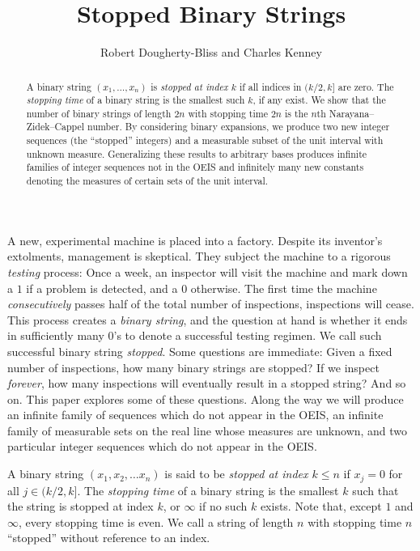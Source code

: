 \documentclass[12pt]{amsart}
\title{Stopped Binary Strings}
\author{Robert Dougherty-Bliss and Charles Kenney}
\theoremstyle{definition}
\begin{document}
\maketitle

\begin{abstract}
    A binary string $(x_1, \dots, x_n)$ is \emph{stopped at index $k$} if all
    indices in $(k / 2, k]$ are zero. The \emph{stopping time} of a binary
    string is the smallest such $k$, if any exist. We show that the number of
    binary strings of length $2n$ with stopping time $2n$ is the $n$th
    Narayana--Zidek--Cappel number. By considering binary expansions, we
    produce two new integer sequences (the ``stopped'' integers) and a
    measurable subset of the unit interval with unknown measure. Generalizing
    these results to arbitrary bases produces infinite families of integer
    sequences not in the OEIS and infinitely many new constants denoting the
    measures of certain sets of the unit interval.
\end{abstract}

\noindent A new, experimental machine is placed into a factory. Despite its
inventor's extolments, management is skeptical. They subject the machine to a
rigorous \emph{testing} process: Once a week, an inspector will visit the
machine and mark down a $1$ if a problem is detected, and a $0$ otherwise. The
first time the machine \emph{consecutively} passes half of the total number of inspections,
inspections will cease. This process creates a \emph{binary string}, and the
question at hand is whether it ends in sufficiently many $0$'s to denote a
successful testing regimen. We call such successful binary string
\emph{stopped}. Some questions are immediate: Given a fixed number of
inspections, how many binary strings are stopped? If we inspect \emph{forever},
how many inspections will eventually result in a stopped string? And so on.
This paper explores some of these questions. Along the way we will produce an
infinite family of sequences which do not appear in the OEIS, an infinite
family of measurable sets on the real line whose measures are unknown, and two
particular integer sequences which do not appear in the OEIS.

A binary string $(x_1, x_2, \dots x_n)$ is said to be \emph{stopped at index $k
\leq n$} if $x_j = 0$ for all $j \in (k / 2, k]$. The \emph{stopping time} of a
binary string is the smallest $k$ such that the string is stopped at index $k$,
or $\infty$ if no such $k$ exists. Note that, except $1$ and $\infty$, every
stopping time is even. We call a string of length $n$ with stopping time $n$
``stopped'' without reference to an index. 
\end{document}

